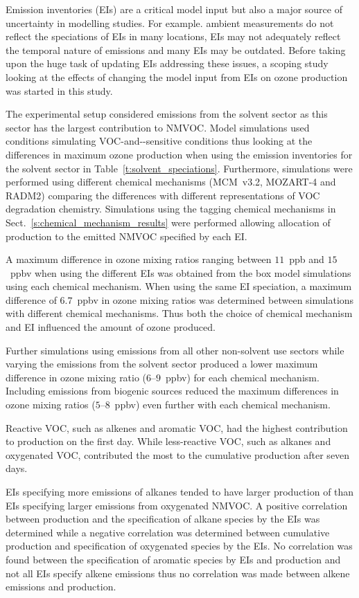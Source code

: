 Emission inventories (EIs) are a critical model input but also a major source of uncertainty in modelling studies.
For example. ambient measurements do not reflect the speciations of EIs in many locations, EIs may not adequately reflect the temporal nature of emissions and many EIs may be outdated.
Before taking upon the huge task of updating EIs addressing these issues, a scoping study looking at the effects of changing the model input from EIs on ozone production was started in this study.

The experimental setup considered emissions from the solvent sector as this sector has the largest contribution to NMVOC. 
Model simulations used  conditions simulating VOC-and--sensitive conditions thus looking at the differences in maximum ozone production when using the emission inventories for the solvent sector in Table~\ref{t:solvent_speciations}.
Furthermore, simulations were performed using different chemical mechanisms (MCM~v3.2, MOZART-4 and RADM2) comparing the differences with different representations of VOC degradation chemistry.
Simulations using the tagging chemical mechanisms in Sect.~\ref{s:chemical_mechanism_results} were performed allowing allocation of  production to the emitted NMVOC specified by each EI.

A maximum difference in ozone mixing ratios ranging between $11$~ppb and $15$~ppbv when using the different EIs was obtained from the box model simulations using each chemical mechanism.
When using the same EI speciation, a maximum difference of $6.7$~ppbv in ozone mixing ratios was determined between simulations with different chemical mechanisms.
Thus both the choice of chemical mechanism and EI influenced the amount of ozone produced.

Further simulations using emissions from all other non-solvent use sectors while varying the emissions from the solvent sector produced a lower maximum difference in ozone mixing ratio ($6$--$9$~ppbv) for each chemical mechanism.
Including emissions from biogenic sources reduced the maximum differences in ozone mixing ratios ($5$--$8$~ppbv) even further with each chemical mechanism.

Reactive VOC, such as alkenes and aromatic VOC, had the highest contribution to  production on the first day.
While less-reactive VOC, such as alkanes and oxygenated VOC, contributed the most to the cumulative  production after seven days.

EIs specifying more emissions of alkanes tended to have larger production of  than EIs specifying larger emissions from oxygenated NMVOC.
A positive correlation between  production and the specification of alkane species by the EIs was determined while a negative correlation was determined between cumulative  production and specification of oxygenated species by the EIs.
No correlation was found between the specification of aromatic species by EIs and  production and not all EIs specify alkene emissions thus no correlation was made between alkene emissions and  production.

